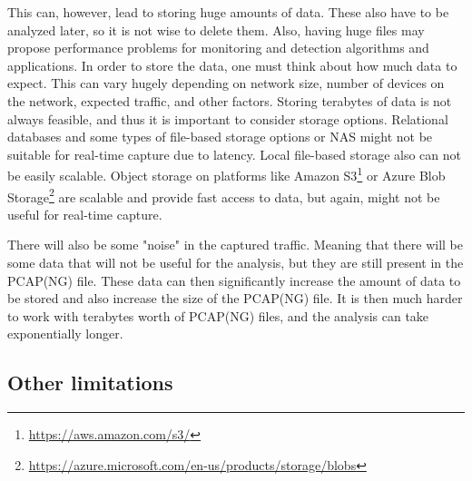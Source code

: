\documentclass[
  printed,     %
  color,       %
  oneside,     %
  nosansbold,  %
  nocolorbold, %
  nolof,         %
  nolot,         %
]{fithesis4}
\begin{document}
This can, however, lead to storing huge amounts of data. These also have to be analyzed later, so it is not wise to delete them. Also, having huge files may propose performance problems for monitoring and detection algorithms and applications. In order to store the data, one must think about how much data to expect. This can vary hugely depending on network size, number of devices on the network, expected traffic, and other factors. Storing terabytes of data is not always feasible, and thus it is important to consider storage options. Relational databases and some types of file-based storage options or NAS might not be suitable for real-time capture due to latency. Local file-based storage also can not be easily scalable. Object storage on platforms like Amazon S3\footnote{\url{https://aws.amazon.com/s3/}} or Azure Blob Storage\footnote{\url{https://azure.microsoft.com/en-us/products/storage/blobs}} are scalable and provide fast access to data, but again, might not be useful for real-time capture.

There will also be some "noise" in the captured traffic. Meaning that there will be some data that will not be useful for the analysis, but they are still present in the PCAP(NG) file. These data can then significantly increase the amount of data to be stored and also increase the size of the PCAP(NG) file. It is then much harder to work with terabytes worth of PCAP(NG) files, and the analysis can take exponentially longer.

\subsection{Other limitations}
\end{document}
